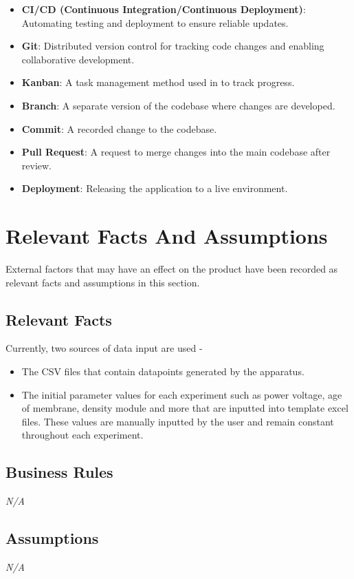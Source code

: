 \documentclass[12pt]{article}
\begin{document}
\begin{itemize}
    \item \textbf{CI/CD (Continuous Integration/Continuous Deployment)}:
    Automating testing and deployment to ensure reliable updates.
    \item \textbf{Git}: Distributed version control for tracking code changes
    and enabling collaborative development.
    \item \textbf{Kanban}: A task management method used in to track progress.
    \item \textbf{Branch}: A separate version of the codebase where changes are
    developed.
    \item \textbf{Commit}: A recorded change to the codebase.
    \item \textbf{Pull Request}: A request to merge changes into the main
    codebase after review.
    \item \textbf{Deployment}: Releasing the application to a live environment.
\end{itemize}

\section{Relevant Facts And Assumptions}
External factors that may have an effect on the product have been recorded as relevant facts and assumptions in this section.
\subsection{Relevant Facts}
Currently, two sources of data input are used -
\begin{itemize}
  \item The CSV files that contain datapoints generated by the apparatus.
  \item The initial parameter values for each experiment such as power voltage, age of membrane, density module and more that are inputted into 
  template excel files. These values are manually inputted by the user and remain constant throughout each experiment.
\end{itemize}

\subsection{Business Rules}
\emph{N/A}
\subsection{Assumptions}
\emph{N/A}
\end{document}
